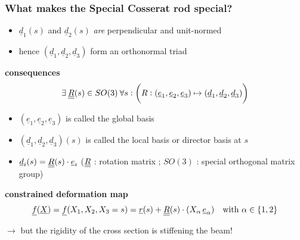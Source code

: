 \begin{frame}
  \frametitle{What makes the Special Cosserat rod special?}

  \begin{itemize}
    \item $\underline{d}_1(s)$ and $\underline{d}_2(s)$ \textit{are} perpendicular and unit-normed
    \item hence $\left( \underline{d}_1, \underline{d}_2, \underline{d}_3 \right)$ form an orthonormal triad
  \end{itemize}
  \vspace{1em}
  
  \textbf{consequences}
  \begin{displaymath}
    \exists \: \underline{\underline{R}}(s) \in SO(3) \: \forall s : \biggl( R: \left( \underline{e}_1, \underline{e}_2, \underline{e}_3 \right) \mapsto \left( \underline{d}_1, \underline{d}_2, \underline{d}_3 \right) \biggr)
  \end{displaymath}
  \begin{itemize}
    \item $\left( \underline{e}_1, \underline{e}_2, \underline{e}_3 \right)$ is called the global basis
    \item $\left( \underline{d}_1, \underline{d}_2, \underline{d}_3 \right)(s)$ is called the local basis or director basis at $s$
    \item $\underline{d}_i(s) = \underline{\underline{R}}(s) \cdot \underline{e}_i$ \quad 
      ($\underline{\underline{R}}$ : rotation matrix ; $SO(3)$ : special orthogonal matrix group)
  \end{itemize}
  \vspace{1em}
  
  \textbf{constrained deformation map}
  \begin{displaymath}
    \underline{f}(\underline{X}) = \underline{f}(X_1,X_2,X_3=s) = \underline{r}(s) + \underline{\underline{R}}(s) \cdot (X_{\alpha} \, \underline{e}_{\alpha}) \quad \text{with } \alpha \in \{1,2\}
  \end{displaymath}
  
  \vspace{0.5em}
  $\rightarrow$ but the rigidity of the cross section is stiffening the beam!
\end{frame}


